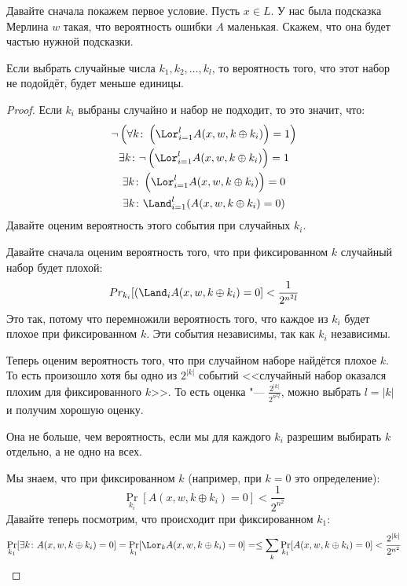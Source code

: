 	Давайте сначала покажем первое условие.
	Пусть $x \in L$.
	У нас была подсказка Мерлина $w$ такая, что вероятность ошибки $A$ маленькая.
	Скажем, что она будет частью нужной подсказки.
	\begin{assertion}
		Если выбрать случайные числа $k_1, k_2, \dots, k_l$, то вероятность того, что
		этот набор не подойдёт, будет меньше единицы.
	\end{assertion}
	\begin{proof}
		Если $k_i$ выбраны случайно и набор не подходит, то это значит, что:
		\begin{gather*}
			\lnot \left(\forall k \colon \left(\Lor_{i=1}^l A(x, w, k \oplus k_i)\right) = 1\right) \\
			\exists k \colon \lnot \left(\Lor_{i=1}^l A(x, w, k \oplus k_i)\right) = 1 \\
			\exists k \colon \left(\Lor_{i=1}^l A(x, w, k \oplus k_i)\right) = 0 \\
			\exists k \colon \Land_{i=1}^l (A(x, w, k \oplus k_i) = 0)
		\end{gather*}
		Давайте оценим вероятность этого события при случайных $k_i$.
		
		Давайте сначала оценим вероятность того, что при фиксированном $k$ случайный набор будет плохой:
		\[
			Pr_{k_i} [ (\Land_i A(x, w, k \oplus k_i) = 0 ] < \frac{1}{2^{n^2l}}
		\]
		Это так, потому что перемножили вероятность того, что каждое из $k_i$ будет плохое при фиксированном $k$.
		Эти события независимы, так как $k_i$ независимы.

		Теперь оценим вероятность того, что при случайном наборе найдётся плохое $k$.
		То есть произошло хотя бы одно из $2^{|k|}$ событий <<случайный набор оказался плохим для фиксированного $k$>>.
		То есть оценка "--- $\frac{2^{|k|}}{2^{n^2l}}$, можно выбрать $l=|k|$ и получим хорошую оценку.

		Она не больше, чем вероятность, если мы для каждого $k_i$ разрешим выбирать $k$ отдельно,
		а не одно на всех.

		Мы знаем, что при фиксированном $k$ (например, при $k=0$ это определение):
		\[
			\Pr\limits_{k_i} [ A(x, w, k \oplus k_i) = 0 ] < \frac{1}{2^{n^2}}
		\]
		Давайте теперь посмотрим, что происходит при фиксированном $k_1$:
		\[
			\Pr\limits_{k_1} [ \exists k \colon A(x, w, k \oplus k_i) = 0 ] =
			\Pr\limits_{k_1} [ \Lor_k A(x, w, k \oplus k_i) = 0 ] =
			\le \sum_k \Pr\limits_{k_1} [ A(x, w, k \oplus k_i) = 0 ] <
			\frac{2^{|k|}}{2^{n^2}}
		\]


\end{proof}
